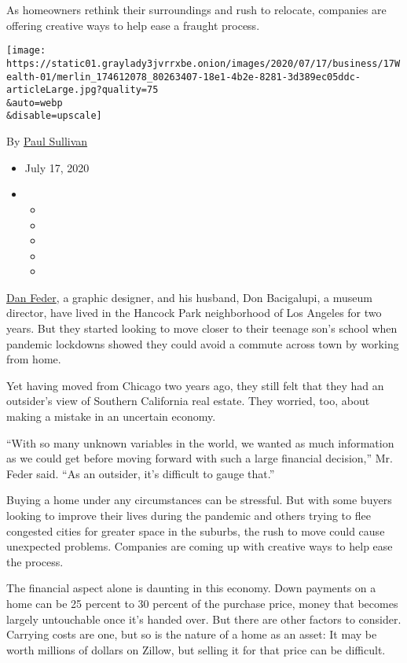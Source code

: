 As homeowners rethink their surroundings and rush to relocate, companies
are offering creative ways to help ease a fraught process.

\texttt{[image: https://static01.graylady3jvrrxbe.onion/images/2020/07/17/business/17Wealth-01/merlin\_174612078\_80263407-18e1-4b2e-8281-3d389ec05ddc-articleLarge.jpg?quality=75\\\&auto=webp\\\&disable=upscale]}

By \href{https://www.nytimes3xbfgragh.onion/by/paul-sullivan}{Paul
Sullivan}

\begin{itemize}
\item
  July 17, 2020
\item
  \begin{itemize}
  \item
  \item
  \item
  \item
  \item
  \end{itemize}
\end{itemize}

\href{https://tmagazine.blogs.nytimes3xbfgragh.onion/2012/03/27/a-bold-move/}{Dan
Feder}, a graphic designer, and his husband, Don Bacigalupi, a museum
director, have lived in the Hancock Park neighborhood of Los Angeles for
two years. But they started looking to move closer to their teenage
son's school when pandemic lockdowns showed they could avoid a commute
across town by working from home.

Yet having moved from Chicago two years ago, they still felt that they
had an outsider's view of Southern California real estate. They worried,
too, about making a mistake in an uncertain economy.

``With so many unknown variables in the world, we wanted as much
information as we could get before moving forward with such a large
financial decision,'' Mr. Feder said. ``As an outsider, it's difficult
to gauge that.''

Buying a home under any circumstances can be stressful. But with some
buyers looking to improve their lives during the pandemic and others
trying to flee congested cities for greater space in the suburbs, the
rush to move could cause unexpected problems. Companies are coming up
with creative ways to help ease the process.

The financial aspect alone is daunting in this economy. Down payments on
a home can be 25 percent to 30 percent of the purchase price, money that
becomes largely untouchable once it's handed over. But there are other
factors to consider. Carrying costs are one, but so is the nature of a
home as an asset: It may be worth millions of dollars on Zillow, but
selling it for that price can be difficult.

